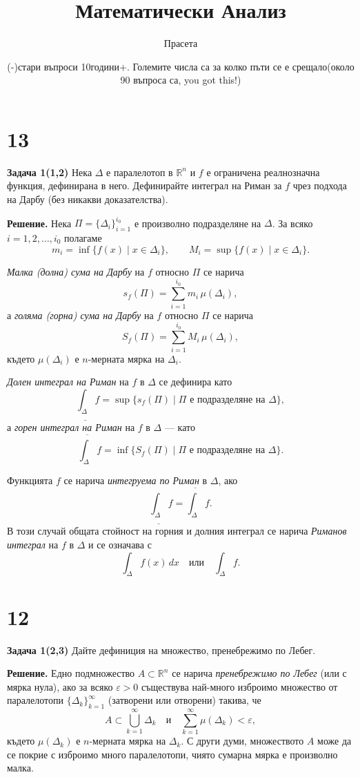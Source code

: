 \documentclass[10pt]{article}
\title{Математически Анализ}
\author{Прасета}
\date{\small (-)стари въпроси 10години+. Големите числа са за колко пъти се е срещало(около 90 въпроса са, you got this!)}
\begin{document}
\maketitle

\section*{13}

\textbf{Задача 1(1,2) }Нека $\Delta$ е паралелотоп в $\mathbb{R}^n$ и $f$ е ограничена реалнозначна функция, дефинирана в него. Дефинирайте интеграл на Риман за $f$ чрез подхода на Дарбу (без никакви доказателства).

\textbf{Решение. }Нека $\Pi = \{\Delta_i\}_{i=1}^{i_0}$ е произволно подразделяне на $\Delta$.  
За всяко $i = 1,2,\dots,i_0$ полагаме
\[
m_i = \inf\{f(x) \mid x \in \Delta_i\}, \qquad 
M_i = \sup\{f(x) \mid x \in \Delta_i\}.
\]

\vspace{0.2cm}
\noindent
\textit{Малка (долна) сума на Дарбу} на $f$ относно $\Pi$ се нарича
\[
s_f(\Pi) = \sum_{i=1}^{i_0} m_i \, \mu(\Delta_i),
\]
а \textit{голяма (горна) сума на Дарбу} на $f$ относно $\Pi$ се нарича
\[
S_f(\Pi) = \sum_{i=1}^{i_0} M_i \, \mu(\Delta_i),
\]
където $\mu(\Delta_i)$ е $n$-мерната мярка на $\Delta_i$.

\vspace{0.2cm}
\noindent
\textit{Долен интеграл на Риман} на $f$ в $\Delta$ се дефинира като
\[
\underline{\int_{\Delta}} f = \sup\{ s_f(\Pi) \mid \Pi \text{ е подразделяне на } \Delta \},
\]
а \textit{горен интеграл на Риман} на $f$ в $\Delta$ — като
\[
\overline{\int_{\Delta}} f = \inf\{ S_f(\Pi) \mid \Pi \text{ е подразделяне на } \Delta \}.
\]

\vspace{0.2cm}
\noindent
Функцията $f$ се нарича \textit{интегруема по Риман} в $\Delta$, ако
\[
\underline{\int_{\Delta}} f = \overline{\int_{\Delta}} f.
\]
В този случай общата стойност на горния и долния интеграл се нарича \textit{Риманов интеграл} на $f$ в $\Delta$ и се означава с
\[
\int_{\Delta} f(x)\,dx \quad \text{или} \quad \int_{\Delta} f.
\]


\section*{12}

\textbf{Задача 1(2,3) }Дайте дефиниция на множество, пренебрежимо по Лебег. 

\textbf{Решение. }Едно подмножество $A \subset \mathbb{R}^n$ се нарича \textit{пренебрежимо по Лебег} (или с мярка нула), ако за всяко $\varepsilon > 0$ съществува най-много изброимо множество от паралелотопи $\{\Delta_k\}_{k=1}^\infty$ (затворени или отворени) такива, че
\[
A \subset \bigcup_{k=1}^\infty \Delta_k \quad \text{и} \quad \sum_{k=1}^\infty \mu(\Delta_k) < \varepsilon,
\]
където $\mu(\Delta_k)$ е $n$-мерната мярка на $\Delta_k$. С други думи, множеството $A$ може да се покрие с изброимо много паралелотопи, чиято сумарна мярка е произволно малка.
\end{document}
